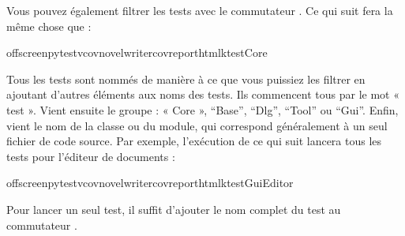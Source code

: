 \documentclass[a4paper,11pt,french]{sphinxmanual}
\begin{document}
\sphinxAtStartPar
Vous pouvez également filtrer les tests avec le commutateur . Ce qui suit fera la même chose que  :

\begin{sphinxVerbatim}[commandchars=\\\{\}]
offscreenpytest\PYGZhy{}v\PYGZhy{}\PYGZhy{}covnovelwriter\PYGZhy{}\PYGZhy{}cov\PYGZhy{}reporthtml\PYGZhy{}ktestCore
\end{sphinxVerbatim}

\sphinxAtStartPar
Tous les tests sont nommés de manière à ce que vous puissiez les filtrer en ajoutant d’autres éléments aux noms des tests. Ils commencent tous par le mot « test ». Vient ensuite le groupe : « Core », “Base”, “Dlg”, “Tool” ou “Gui”. Enfin, vient le nom de la classe ou du module, qui correspond généralement à un seul fichier de code source. Par exemple, l’exécution de ce qui suit lancera tous les tests pour l’éditeur de documents :

\begin{sphinxVerbatim}[commandchars=\\\{\}]
offscreenpytest\PYGZhy{}v\PYGZhy{}\PYGZhy{}covnovelwriter\PYGZhy{}\PYGZhy{}cov\PYGZhy{}reporthtml\PYGZhy{}ktestGuiEditor
\end{sphinxVerbatim}

\sphinxAtStartPar
Pour lancer un seul test, il suffit d’ajouter le nom complet du test au commutateur .



\renewcommand{\indexname}{Index}
\printindex
\end{document}
